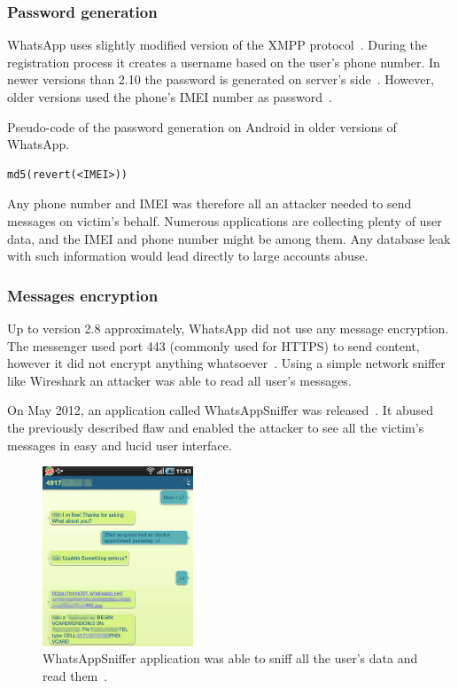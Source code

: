 \documentclass[thesis=M,english]{FITthesis}[2012/10/20]
\begin{document}
\subsubsection{Password generation}

WhatsApp uses slightly modified version of the XMPP protocol~\cite{whatsapp-xmpp}. During the registration process it creates a username based on the user's phone number. In newer versions than 2.10 the password is generated on server's side~\cite{whatsapp-imei}. However, older versions used the phone's IMEI  number as password~\cite{whatsapp-imei, whatsapp-imei2}.

\begin{listing}[htb]
\caption{Pseudo-code of the password generation on Android in older versions of WhatsApp.}
\begin{verbatim}
md5(revert(<IMEI>))
\end{verbatim}
\label{lst:status-whatsapp-password}
\end{listing}


Any phone number and IMEI was therefore all an attacker needed to send messages on victim's behalf. Numerous applications are collecting plenty of user data, and the IMEI and phone number might be among them. Any database leak with such information would lead directly to large accounts abuse.

\subsubsection{Messages encryption}

Up to version 2.8 approximately, WhatsApp did not use any message encryption. The messenger used port 443 (commonly used for HTTPS) to send content, however it did not encrypt anything whatsoever~\cite{whatsapp-plaintext}. Using a simple network sniffer like Wireshark an attacker was able to read all user's messages.

On May 2012, an application called WhatsAppSniffer was released~\cite{whatsapp-sniffer, whatsapp-sniffer2}. It abused the previously described flaw and enabled the attacker to see all the victim's messages in easy and lucid user interface.

\begin{figure}[htb]
	\centering
	\includegraphics[width=0.4\textwidth]{whatsapp-sniffer.png}
	\caption[WhatsAppSniffer]{WhatsAppSniffer application was able to sniff all the user's data and read them~\cite{whatsapp-sniffer2}.}
	\label{img:whatsapp_sniffer}
\end{figure}
\end{document}
